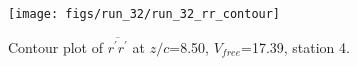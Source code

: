 \begin{figure}[H]
\centering
\texttt{[image: figs/run\_32/run\_32\_rr\_contour]}
\caption{Contour plot of $\overline{r^\prime r^\prime}$ at $z/c$=8.50, $V_{free}$=17.39, station 4.}
\label{fig:run_32_rr_contour}
\end{figure}


